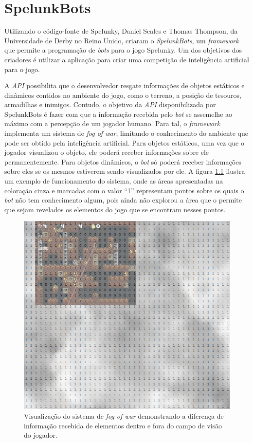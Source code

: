 \chapter{\label{chap:spelunkbots}SpelunkBots}

Utilizando o código-fonte de Spelunky, Daniel Scales e Thomas Thompson, da
Universidade de Derby no Reino Unido, criaram o
\textit{SpelunkBots}\cite{SPELUNKBOTSPAPER}, um
\textit{framework} que permite a programação de \textit{bots} para o jogo
Spelunky. Um dos objetivos dos criadores é utilizar a aplicação para criar uma
competição de inteligência artificial para o jogo.

A \textit{API} possibilita que o desenvolvedor resgate informações de objetos
estáticos e dinâmicos contidos no ambiente do jogo, como o terreno, a
posição de tesouros, armadilhas e inimigos. Contudo, o objetivo da \textit{API}
disponibilizada por SpelunkBots é fazer com que a informação recebida pelo
\textit{bot} se assemelhe ao máximo com a percepção de um jogador humano.  Para
tal, o \textit{framework} implementa um sistema de \textit{fog of war},
limitando o conhecimento do ambiente que pode ser obtido pela inteligência
artificial. Para objetos estáticos, uma vez que o jogador visualizou o objeto,
ele poderá receber informações sobre ele permanentemente. Para objetos
dinâmicos, o \textit{bot} só poderá receber informações sobre eles se os mesmos
estiverem sendo visualizados por ele. A figura \ref{fig:spelunkbots-fow} ilustra
um exemplo de funcionamento do sistema, onde as áreas apresentadas na coloração
cinza e marcadas com o valor ``1'' representam pontos sobre os quais o
\textit{bot} não tem conhecimento algum, pois ainda não explorou a área
que o permite que sejam revelados os elementos do jogo que se encontram
nesses pontos.

\begin{figure}[htb!]
\centering
\includegraphics[width=.65\textwidth]{fig/spelunkbots-fow.png}
\caption {\label{fig:spelunkbots-fow}Visualização do sistema de \textit{fog of
war} demonstrando a diferença de informação recebida de elementos dentro e fora
do campo de visão do jogador.}
\end{figure}

